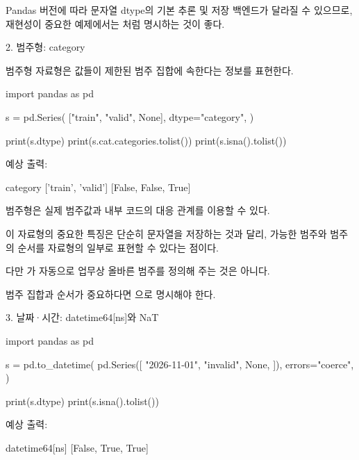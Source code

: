 Pandas 버전에 따라 문자열 dtype의 기본 추론 및 저장 백엔드가 달라질 수 있으므로, 재현성이 중요한 예제에서는 처럼 명시하는 것이 좋다.

\begin{dhknote}
\begin{dhksmry}[centered]
2. 범주형: category
\end{dhksmry}
\end{dhknote}

범주형 자료형은 값들이 제한된 범주 집합에 속한다는 정보를 표현한다.

\begin{dhkcode}
import pandas as pd

s = pd.Series(
    ["train", "valid", None],
    dtype="category",
)

print(s.dtype)
print(s.cat.categories.tolist())
print(s.isna().tolist())
\end{dhkcode}

예상 출력:

\begin{dhkzsh}
category
['train', 'valid']
[False, False, True]
\end{dhkzsh}

범주형은 실제 범주값과 내부 코드의 대응 관계를 이용할 수 있다.

이 자료형의 중요한 특징은 단순히 문자열을 저장하는 것과 달리, 가능한 범주와 범주의 순서를 자료형의 일부로 표현할 수 있다는 점이다.

다만 가 자동으로 업무상 올바른 범주를 정의해 주는 것은 아니다.

범주 집합과 순서가 중요하다면 으로 명시해야 한다.

\begin{dhknote}
\begin{dhksmry}[centered]
3. 날짜·시간: datetime64[ns]와 NaT
\end{dhksmry}
\end{dhknote}

\begin{dhkcode}
import pandas as pd

s = pd.to_datetime(
    pd.Series([
        "2026-11-01",
        "invalid",
        None,
    ]),
    errors="coerce",
)

print(s.dtype)
print(s.isna().tolist())
\end{dhkcode}

예상 출력:

\begin{dhkzsh}
datetime64[ns]
[False, True, True]
\end{dhkzsh}

